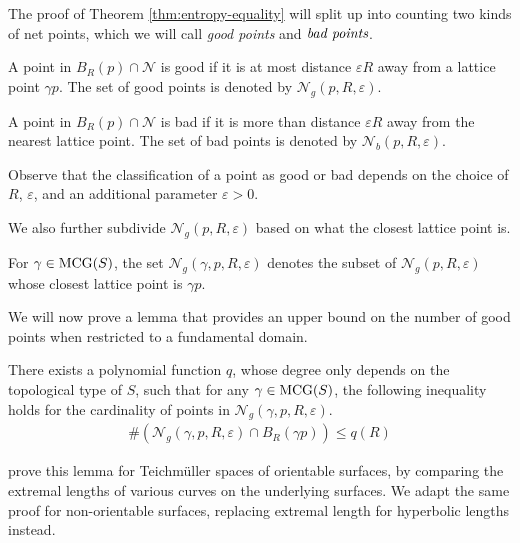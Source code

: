 \documentclass[12pt, reqno]{amsart}
\begin{document}
The proof of Theorem \ref{thm:entropy-equality} will split up into counting two kinds of net points, which we will call \emph{good points} and $\emph{bad points}$.

\begin{definition}
  A point in $B_R(p) \cap \mathcal{N}$ is good if it is at most distance $\varepsilon R$ away from a lattice point $\gamma p$. The set of good points is denoted by $\mathcal{N}_g(p, R, \varepsilon)$.
\end{definition}

\begin{definition}
  A point in $B_R(p) \cap \mathcal{N}$ is bad if it is more than distance $\varepsilon R$ away from the nearest lattice point. The set of bad points is denoted by $\mathcal{N}_b(p, R, \varepsilon)$.
\end{definition}

Observe that the classification of a point as good or bad depends on the choice of $R$, $\varepsilon$, and an additional parameter $\varepsilon > 0$.

We also further subdivide $\mathcal{N}_g(p, R, \varepsilon)$ based on what the closest lattice point is.

\begin{definition}
  For $\gamma \in \mathrm{MCG}(S)$, the set $\mathcal{N}_g(\gamma, p, R, \varepsilon)$ denotes the subset of $\mathcal{N}_g(p, R, \varepsilon)$ whose closest lattice point is $\gamma p$.
\end{definition}

We will now prove a lemma that provides an upper bound on the number of good points when restricted to a fundamental domain.

\begin{lemma}
  \label{lem:fd-polynomial-growth}
  There exists a polynomial function $q$, whose degree only depends on the topological type of $S$, such that for any $\gamma \in \mathrm{MCG}(S)$, the following inequality holds for the cardinality of points in $\mathcal{N}_g(\gamma, p, R, \varepsilon)$.
  \begin{align*}
    \#\left( \mathcal{N}_g(\gamma, p, R, \varepsilon) \cap B_R(\gamma p) \right) \leq q(R)
  \end{align*}
\end{lemma}

\begin{rem}
  \textcite[Lemma 3.2]{eskinmirzakhani} prove this lemma for Teichmüller spaces of orientable surfaces, by comparing the extremal lengths of various curves on the underlying surfaces.
  We adapt the same proof for non-orientable surfaces, replacing extremal length for hyperbolic lengths instead.
\end{rem}
\end{document}
